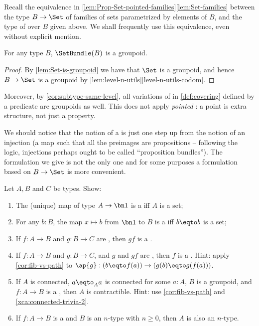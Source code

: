 Recall the equivalence in \cref{lem:Prop-Set-pointed-families}\ref{lem:Set-families}
between the type $B\to\Set$ of families of sets parametrized by elements of $B$, and the type
of \coverings over $B$ given above.
We shall frequently use this equivalence, even without explicit mention.

\begin{lemma}\label{lem:setbundle-is-groupoid}
For any type $B$, $\SetBundle(B)$ is a groupoid.
\end{lemma}
\begin{proof}
By \cref{lem:Set-is-groupoid} we have that $\Set$ is a groupoid,
and hence $B\to\Set$ is a groupoid by 
\cref{lem:level-n-utils}\ref{level-n-utils-codom}.
\end{proof}
Moreover, by \cref{cor:subtype-same-level}, all variations 
of \coverings in \cref{def:covering}
defined by a predicate are groupoids as well. This does not apply
\emph{pointed} \coverings:
a point is extra structure, not just a property.

We should notice that the notion of a \covering is just one step up from the notion of an
injection (a map such that all the preimages are propositions --
following the logic, injections perhaps ought to be called ``proposition bundles'').
The formulation we give is not the only one and for some purposes a formulation
based on $B\to\Set$ is more convenient.

\begin{xca}\label{xca:covering-utils}
Let $A,B$ and $C$ be types. Show:
\begin{enumerate}
\item The (unique) map of type $A\to\bn 1$ is a \covering iff $A$ is a set;
\item For any $b:B$, the map $x \mapsto b$ from $\bn 1$ to $B$ is
a \covering iff $b\eqto b$ is a set;
\item If $f: A\to B$ and $g: B\to C$ are \coverings, then $gf$ is a \covering.
\item\label{it:left-cancel-cover}
If $f: A\to B$ and $g: B\to C$, and $g$ and $gf$ are \coverings, 
then $f$ is a \covering. Hint: apply \cref{cor:fib-vs-path} to
$\ap{g}: (b\eqto f(a))\to(g(b)\eqto g(f(a)))$.
\item If $A$ is connected, $a\eqto_A a$ is connected for some $a:A$,
$B$ is a groupoid, and $f: A\to B$ is a \covering, then $A$ is contractible.
Hint: use \cref{cor:fib-vs-path} and \cref{xca:connected-trivia-2}.
\item \label{it:cover-n-type}
If $f: A\to B$ is a \covering and $B$ is an $n$-type with $n\geq 0$, 
then $A$ is also an $n$-type.\qedhere
\end{enumerate}
\end{xca}

